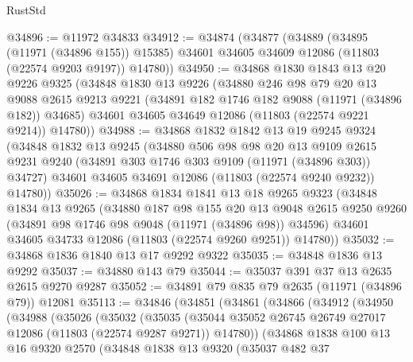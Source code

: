 \begin{lexlean}{RustStd}
\begin{coremodule}
@34896 := @11972 @34833
@34912 := @34874
    (@34877
      (@34889
        (@34895 (@11971 (@34896 @155)) @15385)
        @34601
        @34605
        @34609
        @12086
        (@11803 (@22574 @9203 @9197))
        @14780))
@34950 := @34868
    @1830
    @1843
    @13
    @20
    @9226
    @9325
    (@34848
      @1830
      @13
      @9226
      (@34880
        @246
        @98
        @79
        @20
        @13
        @9088
        @2615
        @9213
        @9221
        (@34891 @182 @1746 @182 @9088 (@11971 (@34896 @182)) @34685)
        @34601
        @34605
        @34649
        @12086
        (@11803 (@22574 @9221 @9214))
        @14780))
@34988 := @34868
    @1832
    @1842
    @13
    @19
    @9245
    @9324
    (@34848
      @1832
      @13
      @9245
      (@34880
        @506
        @98
        @98
        @20
        @13
        @9109
        @2615
        @9231
        @9240
        (@34891 @303 @1746 @303 @9109 (@11971 (@34896 @303)) @34727)
        @34601
        @34605
        @34691
        @12086
        (@11803 (@22574 @9240 @9232))
        @14780))
@35026 := @34868
    @1834
    @1841
    @13
    @18
    @9265
    @9323
    (@34848
      @1834
      @13
      @9265
      (@34880
        @187
        @98
        @155
        @20
        @13
        @9048
        @2615
        @9250
        @9260
        (@34891 @98 @1746 @98 @9048 (@11971 (@34896 @98)) @34596)
        @34601
        @34605
        @34733
        @12086
        (@11803 (@22574 @9260 @9251))
        @14780))
@35032 := @34868 @1836 @1840 @13 @17 @9292 @9322
@35035 := @34848 @1836 @13 @9292
@35037 := @34880 @143 @79
@35044 := @35037 @391 @37 @13 @2635 @2615 @9270 @9287
@35052 := @34891 @79 @835 @79 @2635 (@11971 (@34896 @79)) @12081
@35113 := @34846
    (@34851
      (@34861
        (@34866
          (@34912
            (@34950
              (@34988
                (@35026
                  (@35032
                    (@35035
                      (@35044
                        @35052
                        @26745
                        @26749
                        @27017
                        @12086
                        (@11803 (@22574 @9287 @9271))
                        @14780))
                    (@34868
                      @1838
                      @100
                      @13
                      @16
                      @9320
                      @2570
                      (@34848
                        @1838
                        @13
                        @9320
                        (@35037
                          @482
                          @37

\end{coremodule}
\end{lexlean}
